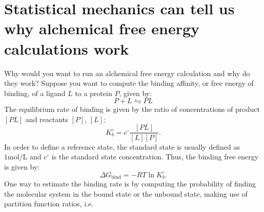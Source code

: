 \documentclass[9pt,bestpractices]{livecoms}
\begin{document}
\section{Statistical mechanics can tell us why alchemical free energy calculations work}
\label{sec:theory}
Why would you want to run an alchemical free energy calculation and why do they work? Suppose you want to compute the binding affinity, or free energy of binding, of a ligand $L$ to a protein $P$, given by:
\begin{equation}
P+L\leftrightharpoons PL
\end{equation}
The equilibrium rate of binding is given by the ratio of concentrations of product $[PL]$ and reactants $[P]$, $[L]$:
\begin{equation}
 K_b^{\circ} = c^{\circ}\frac{[PL]}{[L][P]}.
\end{equation}
In order to define a reference state, the standard state is usually defined as $1 \mathrm{mol}/\mathrm{L}$ and $c^\circ$ is the standard state concentration. Thus, the binding free energy is given by:
\begin{equation}
    \Delta G_{\mathrm{bind}} = -RT\ln K_b^{\circ}.
\end{equation}
One way to estimate the binding rate is by computing the probability of finding the molecular system in the bound state or the unbound state, making use of partition function ratios, i.e. 
\end{document}
